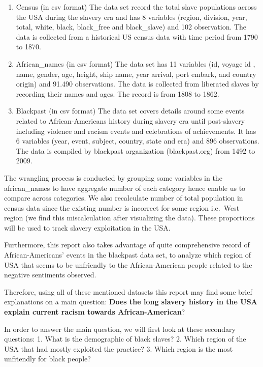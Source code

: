 \documentclass[
]{article}
\begin{document}
\begin{enumerate}
\def\labelenumi{\arabic{enumi}.}
\item
  Census (in csv format)
  The data set record the total slave populations across the USA during the slavery era and has 8 variables (region, division, year, total, white, black, black\_free and black\_slave) and 102 observation. The data is collected from a historical US census data with time period from 1790 to 1870.
\item
  African\_names (in csv format)
  The data set has 11 variables (id, voyage id , name, gender, age, height, ship name, year arrival, port embark, and country origin) and 91.490 observations. The data is collected from liberated slaves by recording their names and ages. The record is from 1808 to 1862.
\item
  Blackpast (in csv format)
  The data set covers details around some events related to African-Americans history during slavery era until post-slavery including violence and racism events and celebrations of achievements. It has 6 variables (year, event, subject, country, state and era) and 896 observations. The data is compiled by blackpast organization (blackpast.org) from 1492 to 2009.
\end{enumerate}

The wrangling process is conducted by grouping some variables in the african\_names to have aggregate number of each category hence enable us to compare across categories. We also recalculate number of total population in census data since the existing number is incorrect for some region i.e.~West region (we find this miscalculation after visualizing the data). These proportions will be used to track slavery exploitation in the USA.

Furthermore, this report also takes advantage of quite comprehensive record of African-Americans' events in the blackpast data set, to analyze which region of USA that seems to be unfriendly to the African-American people related to the negative sentiments observed.

Therefore, using all of these mentioned datasets this report may find some brief explanations on a main question: \textbf{Does the long slavery history in the USA explain current racism towards African-American}?

In order to answer the main question, we will first look at these secondary questions:
1. What is the demographic of black slaves?
2. Which region of the USA that had mostly exploited the practice?
3. Which region is the most unfriendly for black people?
\end{document}
